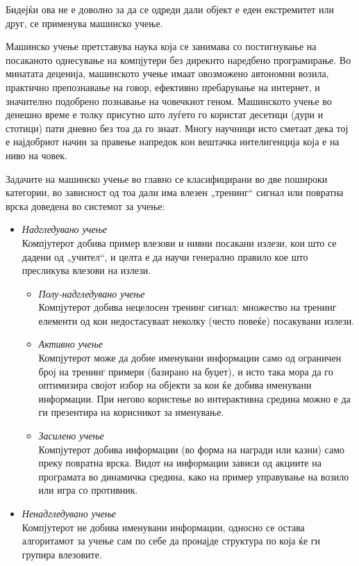 \documentclass[11pt]{article}
\begin{document}
  Бидејќи ова не е доволно за да се одреди дали објект е еден екстремитет или друг, се применува машинско учење.

	Машинско учење претставува наука која се занимава со постигнување на посаканото однесување на компјутери без дирекнто наредбено програмирање. Во минатата деценија, машинското учење имаат овозможено автономни возила, практично препознавање на говор, ефективно пребарување на интернет, и значително подобрено познавање на човечкиот геном. Машинското учење во денешно време е толку присутно што луѓето го користат десетици (дури и стотици) пати дневно без тоа да го знаат. Многу научници исто сметаат дека тој е најдобриот начин за правење напредок кон вештачка интелигенција која е на ниво на човек.

	Задачите на машинско учење во главно се класифицирани во две пошироки категории, во зависност од тоа дали има влезен „тренинг“ сигнал или повратна врска доведена во системот за учење:

	\begin{itemize}
		\item \textit{Надгледувано учење}\\Компјутерот добива пример влезови и нивни посакани излези, кои што се дадени од „учител“, и целта е да научи генерално правило кое што пресликува влезови на излези.
    \begin{itemize}
      \item \textit{Полу-надгледувано учење}\\Компјутерот добива нецелосен тренинг сигнал: множество на тренинг елементи од кои недостасуваат неколку (често повеќе) посакувани излези.
      \item \textit{Активно учење}\\Компјутерот може да добие именувани информации само од ограничен број на тренинг примери (базирано на буџет), и исто така мора да го оптимизира својот избор на објекти за кои ќе добива именувани информации. При негово користење во интерактивна средина можно е да ги презентира на корисникот за именување.
      \item \textit{Засилено учење}\\Компјутерот добива информации (во форма на награди или казни) само преку повратна врска. Видот на информации зависи од акциите на програмата во динамичка средина, како на пример управување на возило или игра со противник.
      \end{itemize}
		\item \textit{Ненадгледувано учење}\\Компјутерот не добива именувани информации, односно се остава алгоритамот за учење сам по себе да пронајде структура по која ќе ги групира влезовите.
    \end{itemize}
\end{document}
